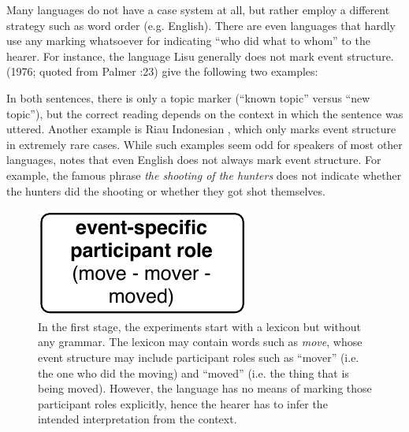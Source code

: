 Many languages do not have a case system at all, but rather employ a different strategy such as word order (e.g. English). There are even languages that hardly use any marking whatsoever for indicating ``who did what to whom'' to the hearer. For instance, the language Lisu generally does not mark event structure. \citeauthor{li76subject} (1976; quoted from Palmer \citeyear{palmer94grammatical}:23) give the following two examples:

\eal
{}
\zl

In both sentences, there is only a topic marker (``known topic'' versus ``new topic''), but the correct reading depends on the context in which the sentence was uttered. Another example is Riau Indonesian \citep{gil08how}, which only marks event structure in extremely rare cases. While such examples seem odd for speakers of most other languages, \citet[23]{palmer94grammatical} notes that even English does not always mark event structure. For example, the famous phrase {\em the shooting of the hunters} does not indicate whether the hunters did the shooting or whether they got shot themselves.

\begin{figure}[t]
\centerline{\includegraphics[scale=0.6]{chap-introduction/figs/stage1}}
    \caption[Formation of case markers: stage II]{In the first stage, the experiments start with a lexicon but without any grammar. The lexicon may contain words such as {\em move}, whose event structure may include participant roles such as ``mover'' (i.e. the one who did the moving) and ``moved'' (i.e. the thing that is being moved). However, the language has no means of marking those participant roles explicitly, hence the hearer has to infer the intended interpretation from the context.}
      \label{f:stage1}
\end{figure}

